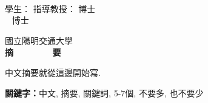 
  \begin{center}
	\large
    \begin{singlespace}    
      \textbf{\chineseTitle{}} \\[0.5cm]
    \end{singlespace}
    
    \begin{singlespace}    

    學生：\studentCnName  \hspace{2.5cm}  指導教授：\advisorCnName \hspace{0.1cm} 博士 \\
    \ifdefined\advisorCnNameB %
    \hspace{9.6cm}  \advisorCnNameB ~ 博士 \\
    \fi
    \end{singlespace}

    \vspace{0.5cm}

    國立陽明交通大學\ \NameofDepartmentInstituteCN\ \iftoggle{iamphd}{博士班}{碩士班} \\[0.5cm]
    \textbf{摘~~~~~~~~要} \\[0.5cm]

  \end{center}
  \normalsize 
  中文摘要就從這邊開始寫.

  \vspace{1cm}

  \textbf{關鍵字：}中文, 摘要, 關鍵詞, 5-7個, 不要多, 也不要少

